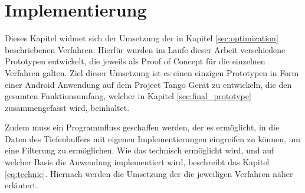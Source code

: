 \chapter{Implementierung} \label{sec:implementation}

Dieses Kapitel widmet sich der Umsetzung der in Kapitel \ref{sec:optimization} beschriebenen Verfahren. Hierfür wurden im Laufe dieser Arbeit verschiedene Prototypen entwickelt, die jeweils als Proof of Concept für die einzelnen Verfahren galten. Ziel dieser Umsetzung ist es einen einzigen Prototypen in Form einer Android Anwendung auf dem Project Tango Gerät zu entwickeln, die den gesamten Funktionsumfang, welcher in Kapitel \ref{sec:final_prototype} zusammengefasst wird, beinhaltet. 

Zudem muss ein Programmfluss geschaffen werden, der es ermöglicht, in die Daten des Tiefenbuffers mit eigenen Implementierungen eingreifen zu können, um eine Filterung zu ermöglichen. Wie das technisch ermöglicht wird, und auf welcher Basis die Anwendung implementiert wird, beschreibt das Kapitel \ref{eq:technic}. Hiernach werden die Umsetzung der die jeweiligen Verfahren näher erläutert.










